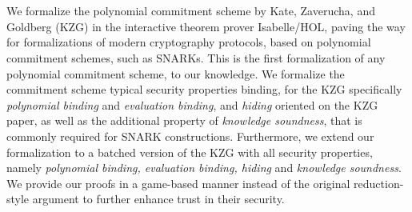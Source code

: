 \chapter{\abstractname}

We formalize the polynomial commitment scheme by Kate, Zaverucha, and Goldberg (KZG) in the interactive theorem prover Isabelle/HOL, paving the way for formalizations of modern cryptography protocols, based on polynomial commitment schemes, such as SNARKs. This is the first formalization of any polynomial commitment scheme, to our knowledge. We formalize the commitment scheme typical security properties binding, for the KZG specifically \textit{polynomial binding} and \textit{evaluation binding}, and \textit{hiding} oriented on the KZG paper, as well as the additional property of \textit{knowledge soundness}, that is commonly required for SNARK constructions. Furthermore, we extend our formalization to a batched version of the KZG with all security properties, namely \textit{polynomial binding, evaluation binding, hiding} and \textit{knowledge soundness}.
We provide our proofs in a game-based manner instead of the original reduction-style argument to further enhance trust in their security.